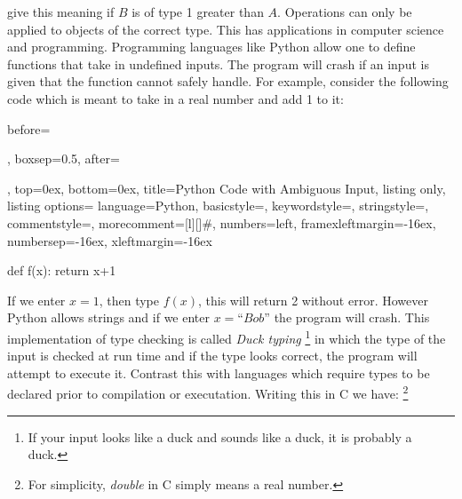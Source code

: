         give this meaning if $B$ is of type 1 greater than $A$. Operations can
        only be applied to objects of the correct type. This has applications in
        computer science and programming. Programming languages like Python
        allow one to define functions that take in undefined inputs. The program
        will crash if an input is given that the function cannot safely handle.
        For example, consider the following code which is meant to take in a
        real number and add 1 to it:
        \par
        \begin{tcblisting}{
            before=\par\vspace{2ex},
            boxsep=0.5\topsep,
            after=\par\vspace{2ex},
            top=0ex,
            bottom=0ex,
            title=Python Code with Ambiguous Input,
            listing only,
            listing options={
                language=Python,
                basicstyle=\ttfamily,
                keywordstyle=\color{blue}\ttfamily,
                stringstyle=\color{red}\ttfamily,
                commentstyle=\color{green}\ttfamily,
                morecomment={[l][\color{magenta}]{\#}},
                numbers=left,
                framexleftmargin=-16ex,
                numbersep=-16ex,
                xleftmargin=-16ex
            }
        }
            def f(x):
                return x+1
        \end{tcblisting}
        If we enter $x=1$, then type $f(x)$, this will return 2 without error.
        However Python allows strings and if we enter $x=\textit{``Bob''}$ the
        program will crash. This implementation of type checking is called
        \textit{Duck typing}%
        \footnote{%
            If your input looks like a duck and sounds like a duck, it is
            probably a duck.
        }
        in which the type of the input is checked at run time and if the type
        looks correct, the program will attempt to execute it. Contrast this
        with languages which require types to be declared prior to compilation
        or executation. Writing this in C we have:%
        \footnote{%
            For simplicity, \textit{double} in C simply means a real number.
        }
